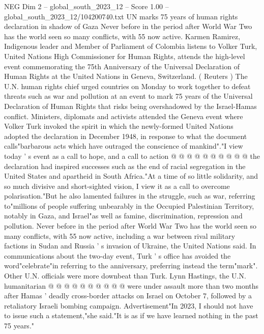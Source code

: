\begin{textsample}{NEG Dim 2 – global\_south\_2023\_12 – Score 1.00 – global\_south\_2023\_12/104200740.txt}  \label{ex:f2_neg_428}
UN marks 75 years of human rights declaration in shadow of Gaza Never before in the period after World War Two has the world seen so many conflicts, with 55 now active.
Karmen Ramirez, Indigenous leader and Member of Parliament of Colombia listens to Volker Turk, United Nations High Commissioner for Human Rights, attends the high-level event commemorating the 75th Anniversary of the Universal Declaration of Human Rights at the United Nations in Geneva, Switzerland. ( Reuters ) The U.N. human rights chief urged countries on Monday to work together to defeat threats such as war and pollution at an event to mark 75 years of the Universal Declaration of Human Rights that risks being overshadowed by the Israel-Hamas conflict.
Ministers, diplomats and activists attended the Geneva event where Volker Turk invoked the spirit in which the newly-formed United Nations adopted the declaration in December 1948, in response to what the document calls"barbarous acts which have outraged the conscience of mankind"."I view today ' s event as a call to hope, and a call to action @ @ @ @ @ @ @ @ @ @ the declaration had inspired successes such as the end of racial segregation in the United States and apartheid in South Africa."At a time of so little solidarity, and so much divisive and short-sighted vision, I view it as a call to overcome polarisation."But he also lamented failures in the struggle, such as war, referring to"millions of people suffering unbearably in the Occupied Palestinian Territory, notably in Gaza, and Israel"as well as famine, discrimination, repression and pollution.
Never before in the period after World War Two has the world seen so many conflicts, with 55 now active, including a war between rival military factions in Sudan and Russia ' s invasion of Ukraine, the United Nations said.
In communications about the two-day event, Turk ' s office has avoided the word"celebrate"in referring to the anniversary, preferring instead the term"mark".
Other U.N. officials were more downbeat than Turk.
Lynn Hastings, the U.N. humanitarian @ @ @ @ @ @ @ @ @ @ were under assault more than two months after Hamas ' deadly cross-border attacks on Israel on October 7, followed by a retaliatory Israeli bombing campaign.
Advertisement"In 2023, I should not have to issue such a statement,"she said."It is as if we have learned nothing in the past 75 years."

\end{textsample}

